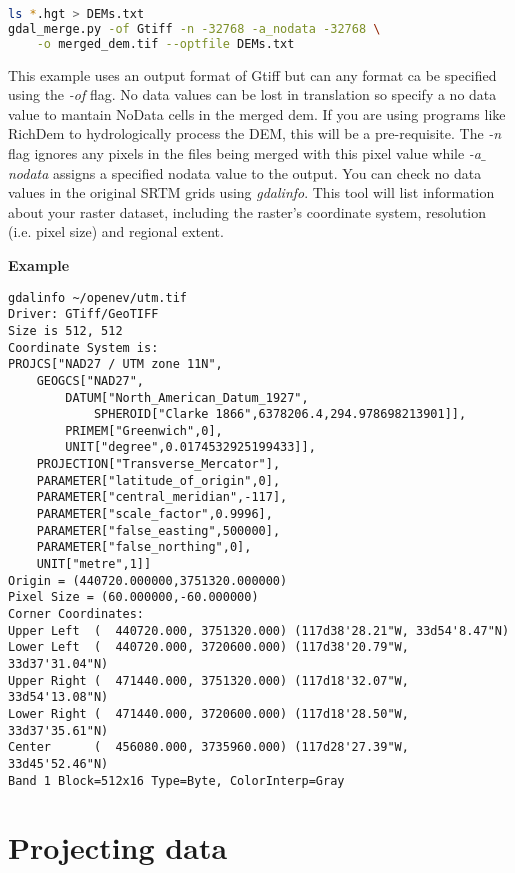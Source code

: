 \begin{lstlisting}[language=bash]
ls *.hgt > DEMs.txt
gdal_merge.py -of Gtiff -n -32768 -a_nodata -32768 \
	-o merged_dem.tif --optfile DEMs.txt
\end{lstlisting}

\noindent This example uses an output format of Gtiff but can any format ca be specified using the \textit{-of} flag. No data values can be lost in translation so specify a no data value to mantain NoData cells in the merged dem. If you are using programs like RichDem to hydrologically process the DEM, this will be a pre-requisite. The \textit{-n} flag ignores any pixels in the files being merged with this pixel value while \textit{-a${\_}$nodata} assigns a specified nodata value to the output. You can check no data values in the original SRTM grids using \textit{gdalinfo}. This tool will list information about your raster dataset, including the raster’s coordinate system, resolution (i.e. pixel size) and regional extent. 

\vspace{3mm}

\noindent \textbf{Example}
\begin{lstlisting}
gdalinfo ~/openev/utm.tif
Driver: GTiff/GeoTIFF
Size is 512, 512
Coordinate System is:
PROJCS["NAD27 / UTM zone 11N",
    GEOGCS["NAD27",
        DATUM["North_American_Datum_1927",
            SPHEROID["Clarke 1866",6378206.4,294.978698213901]],
        PRIMEM["Greenwich",0],
        UNIT["degree",0.0174532925199433]],
    PROJECTION["Transverse_Mercator"],
    PARAMETER["latitude_of_origin",0],
    PARAMETER["central_meridian",-117],
    PARAMETER["scale_factor",0.9996],
    PARAMETER["false_easting",500000],
    PARAMETER["false_northing",0],
    UNIT["metre",1]]
Origin = (440720.000000,3751320.000000)
Pixel Size = (60.000000,-60.000000)
Corner Coordinates:
Upper Left  (  440720.000, 3751320.000) (117d38'28.21"W, 33d54'8.47"N)
Lower Left  (  440720.000, 3720600.000) (117d38'20.79"W, 33d37'31.04"N)
Upper Right (  471440.000, 3751320.000) (117d18'32.07"W, 33d54'13.08"N)
Lower Right (  471440.000, 3720600.000) (117d18'28.50"W, 33d37'35.61"N)
Center      (  456080.000, 3735960.000) (117d28'27.39"W, 33d45'52.46"N)
Band 1 Block=512x16 Type=Byte, ColorInterp=Gray
\end{lstlisting}


\section{Projecting data}

